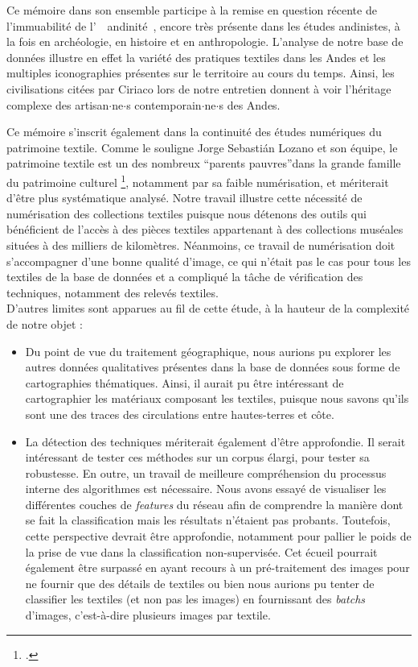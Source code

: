 \documentclass[a4paper, twoside]{book}
\newcommand{\inclusives}[1]{$\cdot${#1}$\cdot${s}}
\begin{document}
Ce mémoire dans son ensemble participe à la remise en question récente de l'immuabilité de l'~\og~andinité~\fg, encore très présente dans les études andinistes, à la fois en archéologie, en histoire et en anthropologie. L'analyse de notre base de données illustre en effet la variété des pratiques textiles dans les Andes et les multiples iconographies présentes sur le territoire au cours du temps. Ainsi, les civilisations citées par Ciriaco lors de notre entretien donnent à voir l'héritage complexe des artisan\inclusives{ne} contemporain\inclusives{ne} des Andes. 

Ce mémoire s'inscrit également dans la continuité des études numériques du patrimoine textile. Comme le souligne Jorge Sebastián Lozano et son équipe, \og le patrimoine textile est un des nombreux \textquotedblleft parents pauvres\textquotedblright \:dans la grande famille du patrimoine culturel \fg\footcite[p.~76]{sebastianlozanoCatalogosMuseoGran2020}, notamment par sa faible numérisation, et mériterait d'être plus systématique analysé. Notre travail illustre cette nécessité de numérisation des collections textiles puisque nous détenons des outils qui bénéficient de l'accès à des pièces textiles appartenant à des collections muséales situées à des milliers de kilomètres. Néanmoins, ce travail de numérisation doit s'accompagner d'une bonne qualité d'image, ce qui n'était pas le cas pour tous les textiles de la base de données et a compliqué la tâche de vérification des techniques, notamment des relevés textiles.\\

D'autres limites sont apparues au fil de cette étude, à la hauteur de la complexité de notre objet : 
\begin{itemize}
	\item Du point de vue du traitement géographique, nous aurions pu explorer les autres données qualitatives présentes dans la base de données sous forme de cartographies thématiques. Ainsi, il aurait pu être intéressant de cartographier les matériaux composant les textiles, puisque nous savons qu'ils sont une des traces des circulations entre hautes-terres et côte. 
	\item La détection des techniques mériterait également d'être approfondie. Il serait intéressant de tester ces méthodes sur un corpus élargi, pour tester sa robustesse. En outre, un travail de meilleure compréhension du processus interne des algorithmes est nécessaire. Nous avons essayé de visualiser les différentes couches de \textit{features} du réseau afin de comprendre la manière dont se fait la classification mais les résultats n'étaient pas probants. Toutefois, cette perspective devrait être approfondie, notamment pour pallier le poids de la prise de vue dans la classification non-supervisée. Cet écueil pourrait également être surpassé en ayant recours à un pré-traitement des images pour ne fournir que des détails de textiles ou bien nous aurions pu tenter de classifier les textiles (et non pas les images) en fournissant des \textit{batchs} d'images, c'est-à-dire plusieurs images par textile.
\end{itemize}
\end{document}
